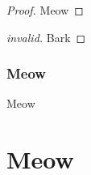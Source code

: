 \documentclass{article}
\newcommand{\spolyfune}{\polyfune{\sfontsym}{\sfont}}
\newcommand{\sabstre}{\abstre{\sfontsym}{\sfont}}
\newcommand{\sinste}{\inste{\sfontsym}{\sfont}}
\newcommand{\sappe}{\appe{\sfontsym}{\sfont}}
\newcommand{\spappe}{\pappe{\sfontsym}{\sfont}}
\newcommand{\sexistty}{\existty{\sfontsym}{\sfont}}
\newcommand{\sife}{\ife{\sfontsym}{\sfont}}
\newcommand{\spacke}{\packe{\sfontsym}{\sfont}}
\newcommand{\sunpacke}{\unpacke{\sfontsym}{\sfont}}
\newcommand{\slete}{\lete{\sfontsym}{\sfont}}
\newcommand{\sfolde}{\folde{\sfontsym}{\sfont}}
\newcommand{\sunfolde}{\unfolde{\sfontsym}{\sfont}}
\newcommand{\sunite}{\unite{\sfontsym}{\sfont}}
\newcommand{\struee}{\truee{\sfontsym}{\sfont}}
\newcommand{\sfalsee}{\falsee{\sfontsym}{\sfont}}
\newcommand{\spaire}{\paire{\sfontsym}{\sfont}}
\begin{document}
\begin{smathpar}
  \spolyfune{\salpha}{\sx}{\sty}{\sepr}

  \sabstre{\salpha}{\sty}

  \sinste{\se}{\sty}

  \sappe{\seone}{\setwo}

  \spappe{\seone}{\stypr}{\setwopr}

  \sife{\sv}{\seone}{\setwo}

  \spacke{\styone}{\se}{\sexistty{\salpha}{\stytwo}}

  \sunpacke{\salpha}{\sx}{\svpr}{\seone}

  \telet{\tx}{\te}{\teone}

  \slete{\sx}{\se}{\seone}

  \sfolde{\tmuty{\salpha}{\styone}}{\sty}

  \sunfolde{\seone}

  \sunite

  \struee

  \sfalsee

  \spaire{\seone}{\svtwopr}

  \stx

  \stalphaonepr

  \stxpr[100]
  \stxonepr[5]

  \ctxtyjudg{\tfont}{\tfont{\ectx}}{\tfont{\Gamma}}{\tty}{\tfont{\Gamma}}{\ttypr}

  \rho

  \mapat{\rho}{\talpha}

  \maponeat{\rho}{\talpha}

  \maptwoat{\rho}{\talpha}

  \maprelat{\rho}{\talpha}

  \mapext{\rho}{\talpha}{\tty}

\end{smathpar}

%

\begin{proof}
  Meow
\end{proof}

\begin{proof}[invalid]
  Bark
\end{proof}


\subsubsection{Meow}
Meow

\section{Meow}
\end{document}
